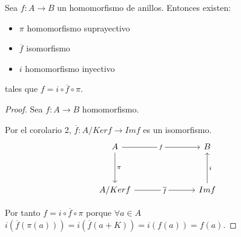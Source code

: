 \begin{corollary}
	Sea \(f \colon A \to B \) un homomorfismo de anillos. Entonces existen:
	\begin{itemize}
		\item \(\pi \) homomorfismo suprayectivo
		\item \(\overline{f }\) isomorfismo
		\item \(i \) homomorfismo inyectivo
	\end{itemize}
	tales que \(f = i \circ \overline{f} \circ \pi \).
\end{corollary}
\begin{proof}
	Sea \(f \colon A \to B \) homomorfismo.
	
	Por el corolario 2, \(\overline{f} \colon A/Kerf \to Imf \) es un isomorfismo.
	\[\begin{tikzcd}
			A &&& B \\
			\\
			{A/Kerf} &&& Imf
			\arrow["\pi", from=1-1, to=3-1]
			\arrow["i"', from=3-4, to=1-4]
			\arrow["f"{description}, from=1-1, to=1-4]
			\arrow["{\overline{f}}"{description}, from=3-1, to=3-4]
		\end{tikzcd}\]
	
	Por tanto \(f = i \circ  \overline{f} \circ  \pi \) porque \(\forall a \in A \) \(i(\overline{f}(\pi(a))) = i(\overline{f}(a + K)) = i(f(a)) = f(a)\).
\end{proof}
